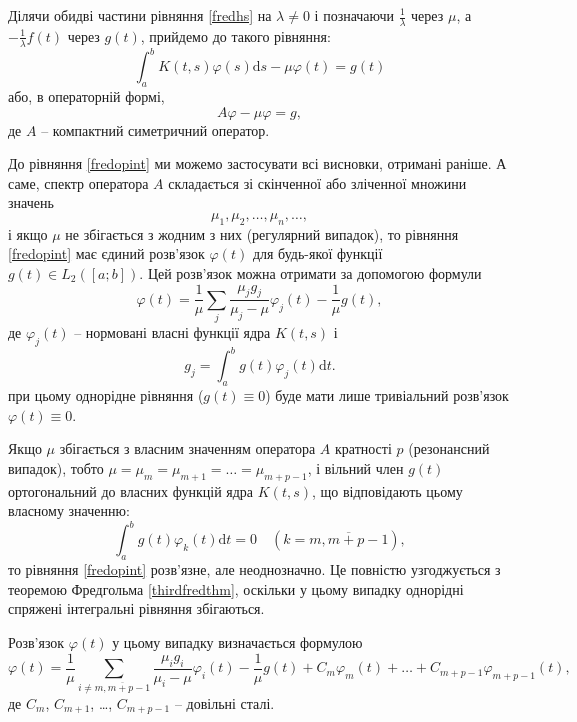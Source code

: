 \documentclass[14pt,twoside]{extreport}
\theoremstyle{mystyle}
\numberwithin{equation}{chapter}
\begin{document}
Ділячи обидві частини рівняння \eqref{fredhs} на $\lambda \neq 0$ і позначаючи $\frac{1}{\lambda}$ через $\mu$, а $- \frac{1}{\lambda} f(t)$ через $g(t)$, прийдемо до такого рівняння:
\begin{equation}
 \int_a^b K(t, s) \varphi(s) \mathrm{d}s - \mu \varphi(t) = g(t)
\end{equation}
або, в операторній формі,
\begin{equation}\label{fredopint}
 A\varphi - \mu \varphi = g,
\end{equation}
де $A$ -- компактний симетричний оператор.

До рівняння \eqref{fredopint} ми можемо застосувати всі висновки, отримані раніше. А саме, спектр оператора $A$ складається зі скінченної або зліченної множини значень
\[
 \mu_1, \mu_2, \ldots, \mu_n, \ldots,
\]
і якщо $\mu$ не збігається з жодним з них (регулярний випадок), то рівняння \eqref{fredopint} має єдиний розв'язок $\varphi(t)$ для будь-якої функції $g(t) \in L_2([a; b])$. Цей розв'язок можна отримати за допомогою формули
\begin{equation}\label{solhs}
 \varphi(t) = \frac{1}{\mu} \sum_{j}\frac{\mu_j g_j}{\mu_j - \mu}\varphi_j(t) - \frac{1}{\mu} g(t),
\end{equation}
де $\varphi_j(t)$ -- нормовані власні функції ядра $K(t, s)$ і
\[
 g_j = \int_a^b g(t) \varphi_j(t) \mathrm{d}t.
\]
при цьому однорідне рівняння ($g(t) \equiv 0$) буде мати лише тривіальний розв'язок $\varphi(t) \equiv 0$.

Якщо $\mu$ збігається з власним значенням оператора $A$ кратності $p$ (резонансний випадок), тобто $\mu = \mu_m = \mu_{m+1} = \ldots = \mu_{m+p-1}$, і вільний член $g(t)$ ортогональний до власних функцій ядра $K(t, s)$, що відповідають цьому власному значенню:
\begin{equation}
 \int_a^b g(t) \varphi_k(t)\mathrm{d}t=0 \quad (k=\overline{m, m+p-1}),
\end{equation}
то рівняння \eqref{fredopint} розв'язне, але неоднозначно. Це повністю узгоджується з теоремою Фредгольма \ref{thirdfredthm}, оскільки у цьому випадку однорідні спряжені інтегральні рівняння збігаються.

Розв'язок $\varphi(t)$ у цьому випадку визначається формулою
\begin{equation}\label{ressolhs}
 \varphi(t) = \frac{1}{\mu} \sum_{i\neq \overline{m, m+p-1}} \frac{\mu_i g_i}{\mu_i - \mu} \varphi_i(t) - \frac{1}{\mu} g(t) + C_m \varphi_m(t) + \ldots + C_{m+p-1} \varphi_{m+p-1} (t),
\end{equation}
де $C_m$, $C_{m+1}$, \ldots , $C_{m+p-1}$ -- довільні сталі.
\end{document}
